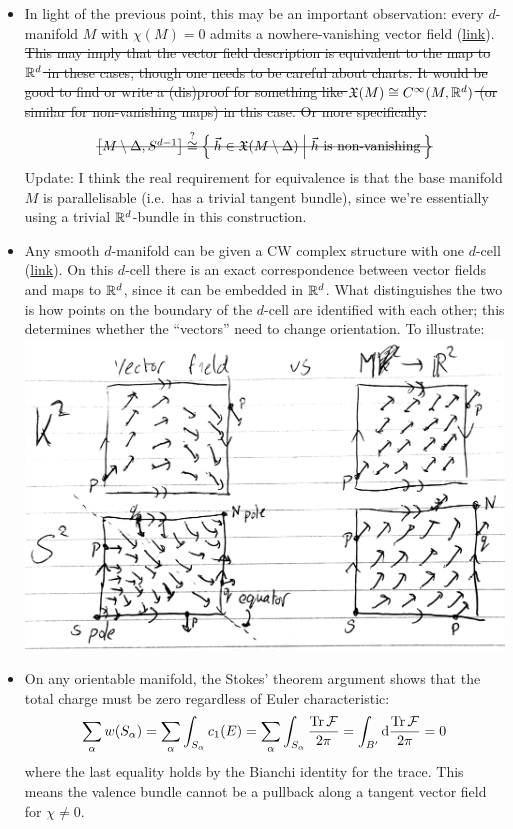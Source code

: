 {\begin{itemize}
	\item In light of the previous point, this may be an important observation: every $d$-manifold $M$ with $\chi(M)=0$ admits a nowhere-vanishing vector field (\href{https://math.stackexchange.com/questions/47370/if-a-manifold-m-has-zero-euler-characteristic-there-is-a-non-vanishing-vector-f}{link}). \st{This may imply that the vector field description is equivalent to the map to $\mathbb{R}^d$ in these cases, though one needs to be careful about charts. It would be good to find or write a (dis)proof for something like $\mathfrak{X}(M)\cong C^\infty(M,\mathbb{R}^d)$ (or similar for non-vanishing maps) in this case. Or more specifically:}
	\[
		\st{\big[M\setminus\Delta,S^{d-1}\big] \stackrel{?}{\cong} \Set{\vec{h}\in\vct(M\setminus\Delta) | \text{$\vec{h}$ is non-vanishing}}}
	\]
	Update: I think the real requirement for equivalence is that the base manifold $M$ is parallelisable (i.e.\ has a trivial tangent bundle), since we're essentially using a trivial $\mathbb{R}^d$-bundle in this construction.
	
	\item Any smooth $d$-manifold can be given a CW complex structure with one $d$-cell (\href{https://mathoverflow.net/questions/120799/manifolds-admitting-cw-structure-with-single-n-cell}{link}). On this $d$-cell there is an exact correspondence between vector fields and maps to $\mathbb{R}^d$, since it can be embedded in $\mathbb{R}^d$. What distinguishes the two is how points on the boundary of the $d$-cell are identified with each other; this determines whether the ``vectors'' need to change orientation. To illustrate:\\
	\includegraphics[width=.9\textwidth]{Images/vectorfield-vs-map}
	
	\item On any orientable manifold, the Stokes' theorem argument shows that the total charge must be zero regardless of Euler characteristic:
	\[
		\sum_{\alpha}w(S_\alpha) = \sum_{\alpha}\int_{S_\alpha} c_1(E) = \sum_{\alpha}\int_{S_\alpha}\frac{\Tr\mathcal{F}}{2\pi} = \int_{B'} \dd{\frac{\Tr\mathcal{F}}{2\pi}} = 0
	\]
	where the last equality holds by the Bianchi identity for the trace. This means the valence bundle cannot be a pullback along a tangent vector field for $\chi\neq0$.
	

\end{itemize}}
